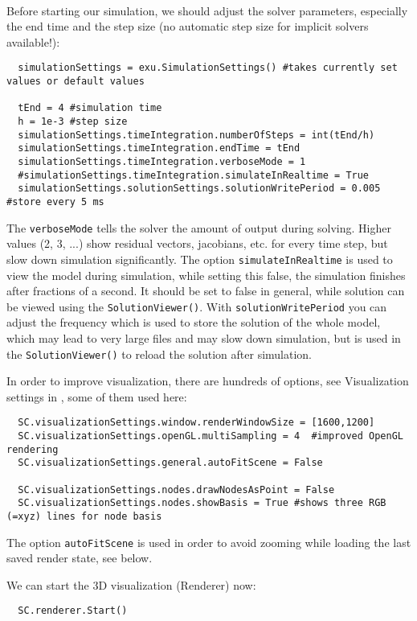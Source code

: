 \horizontalRuler\\
\noindent Before starting our simulation, we should adjust the solver parameters, especially the end time and the step size (no automatic step size for implicit solvers available!):
\pythonstyle\begin{lstlisting}
  simulationSettings = exu.SimulationSettings() #takes currently set values or default values

  tEnd = 4 #simulation time
  h = 1e-3 #step size
  simulationSettings.timeIntegration.numberOfSteps = int(tEnd/h)
  simulationSettings.timeIntegration.endTime = tEnd
  simulationSettings.timeIntegration.verboseMode = 1
  #simulationSettings.timeIntegration.simulateInRealtime = True
  simulationSettings.solutionSettings.solutionWritePeriod = 0.005 #store every 5 ms
\end{lstlisting}
The \texttt{verboseMode} tells the solver the amount of output during solving. Higher values (2, 3, ...) show residual vectors, jacobians, etc. for every time step, but slow down simulation significantly.
The option \texttt{simulateInRealtime} is used to view the model during simulation, while setting this false, 
the simulation finishes after fractions of a second. It should be set to false in general, 
while solution can be viewed using the \texttt{SolutionViewer()}.
With \texttt{solutionWritePeriod} you can adjust the frequency which is used to store the solution of the whole model, 
which may lead to very large files and may slow down simulation, but is used in the \texttt{SolutionViewer()} to reload the solution after simulation.

\noindent In order to improve visualization, there are hundreds of options, see Visualization settings in , some of them used here:
\pythonstyle\begin{lstlisting}
  SC.visualizationSettings.window.renderWindowSize = [1600,1200]
  SC.visualizationSettings.openGL.multiSampling = 4  #improved OpenGL rendering
  SC.visualizationSettings.general.autoFitScene = False

  SC.visualizationSettings.nodes.drawNodesAsPoint = False
  SC.visualizationSettings.nodes.showBasis = True #shows three RGB (=xyz) lines for node basis
\end{lstlisting}
The option \texttt{autoFitScene} is used in order to avoid zooming while loading the last saved render state, see below.

\noindent We can start the 3D visualization (Renderer) now:
\pythonstyle\begin{lstlisting}
  SC.renderer.Start()
\end{lstlisting}

